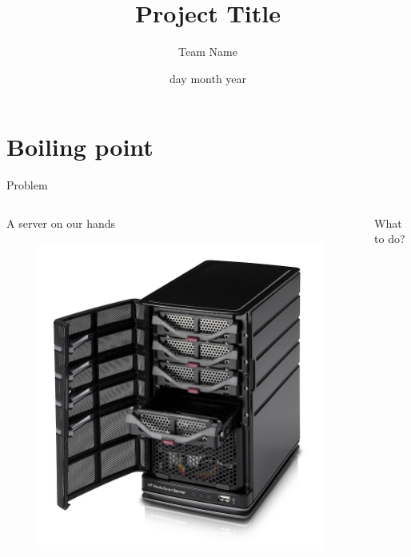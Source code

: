 \documentclass{soa.cs.pub.ro}
\title[Project Title Abbreviation]{Project Title}
\subtitle{Team Name}
\date{day month year}
\begin{document}
\frame{\titlepage}

\frame{\tableofcontents}



\section{Boiling point}

\begin{frame}{Problem}
  \begin{columns}
    \pause
    \begin{column}[l]{0.45\textwidth}
      \begin{center}
        A server on our hands
      \end{center}
      \begin{figure}
         \includegraphics[scale=0.17]{img/hp-server.jpg}
      \end{figure}
    \end{column}
    \pause
    \begin{column}[l]{0.45\textwidth}
      \begin{center}
        What to do?
      \end{center}
      \begin{figure}

\end{figure}
\end{column}
\end{columns}
\end{frame}
\end{document}
